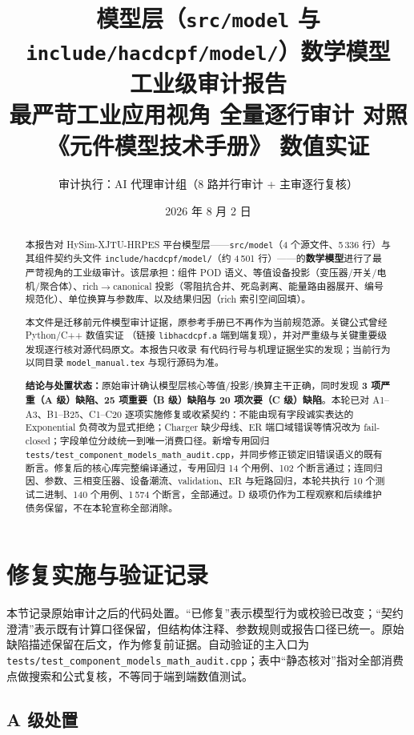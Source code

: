 \documentclass[11pt,a4paper,fontset=fandol]{ctexart}
\title{\textbf{模型层（\texttt{src/model} 与 \texttt{include/hacdcpf/model/}）数学模型\\工业级审计报告}\\[0.5em]
\large 最严苛工业应用视角 \textbar{} 全量逐行审计 \textbar{} 对照《元件模型技术手册》\textbar{} 数值实证}
\author{审计执行：AI 代理审计组（8 路并行审计 + 主审逐行复核）}
\date{2026 年 8 月 2 日}
\newcommand{\file}[1]{\texttt{#1}}
\begin{document}
\maketitle

\begin{abstract}
\noindent
本报告对 HySim-XJTU-HRPES 平台模型层——\file{src/model}（4 个源文件、5\,336 行）与其组件契约头文件 \file{include/hacdcpf/model/}（约 4\,501 行）——的\textbf{数学模型}进行了最严苛视角的工业级审计。该层承担：组件 POD 语义、等值设备投影（变压器/开关/电机/聚合体）、rich$\to$canonical 投影（零阻抗合并、死岛剥离、能量路由器展开、编号规范化）、单位换算与参数库、以及结果归因（rich 索引空间回填）。

本文件是迁移前元件模型审计证据，原参考手册已不再作为当前规范源。关键公式曾经 Python/C++ 数值实证
（链接 \file{libhacdcpf.a} 端到端复现），并对严重级与关键重要级发现逐行核对源代码原文。本报告只收录
有代码行号与机理证据坐实的发现；当前行为以同目录 \file{model\_manual.tex} 与现行源码为准。

\textbf{结论与处置状态：}原始审计确认模型层核心等值/投影/换算主干正确，同时发现 \textbf{3 项严重（A 级）缺陷、25 项重要（B 级）缺陷与 20 项次要（C 级）缺陷}。本轮已对 A1--A3、B1--B25、C1--C20 逐项实施修复或收紧契约：不能由现有字段诚实表达的 Exponential 负荷改为显式拒绝；Charger 缺少母线、ER 端口域错误等情况改为 fail-closed；字段单位分歧统一到唯一消费口径。新增专用回归 \file{tests/test\_component\_models\_math\_audit.cpp}，并同步修正锁定旧错误语义的既有断言。修复后的核心库完整编译通过，专用回归 14 个用例、102 个断言通过；连同归因、参数、三相变压器、设备潮流、validation、ER 与短路回归，本轮共执行 10 个测试二进制、140 个用例、1\,574 个断言，全部通过。D 级项仍作为工程观察和后续维护债务保留，不在本轮宣称全部消除。
\end{abstract}

\tableofcontents
\newpage

\section{修复实施与验证记录}
\label{sec:remediation}

本节记录原始审计之后的代码处置。``已修复''表示模型行为或校验已改变；``契约澄清''表示既有计算口径保留，但结构体注释、参数规则或报告口径已统一。原始缺陷描述保留在后文，作为修复前证据。自动验证的主入口为
\file{tests/test\_component\_models\_math\_audit.cpp}；表中``静态核对''指对全部消费点做搜索和公式复核，不等同于端到端数值测试。

\subsection{A 级处置}
\end{document}
